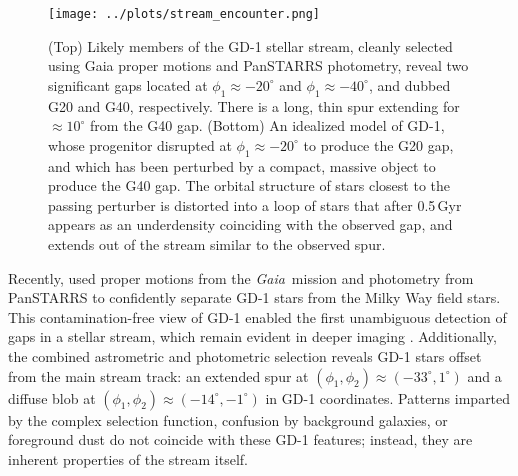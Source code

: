 \documentclass[twocolumn]{aastex62}
\newcommand{\gaia}{\textsl{Gaia}}
\begin{document}
\begin{figure}
\begin{center}
\texttt{[image: ../plots/stream\_encounter.png]}
\end{center}
\caption{(Top) Likely members of the GD-1 stellar stream, cleanly selected using Gaia proper motions and PanSTARRS photometry, reveal two significant gaps located at $\phi_1\approx-20^\circ$ and $\phi_1\approx-40^\circ$, and dubbed G20 and G40, respectively.
There is a long, thin spur extending for $\approx10^\circ$ from the G40 gap.
(Bottom) An idealized model of GD-1, whose progenitor disrupted at $\phi_1\approx-20^\circ$ to produce the G20 gap, and which has been perturbed by a compact, massive object to produce the G40 gap.
The orbital structure of stars closest to the passing perturber is distorted into a loop of stars that after 0.5\,Gyr appears as an underdensity coinciding with the observed gap, and extends out of the stream similar to the observed spur.
}
\label{fig:fiducial}
\end{figure}

Recently, \citet{pwb} used proper motions from the \gaia\ mission \citep{gdr2} and photometry from PanSTARRS \citep{ps} to confidently separate GD-1 stars from the Milky Way field stars.
This contamination-free view of GD-1 enabled the first unambiguous detection of gaps in a stellar stream, which remain evident in deeper imaging \citep{deboer2018}.
Additionally, the combined astrometric and photometric selection reveals GD-1 stars offset from the main stream track: an extended spur at $(\phi_1, \phi_2)\approx(-33^\circ,1^\circ)$ and a diffuse blob at $(\phi_1, \phi_2)\approx(-14^\circ,-1^\circ)$ in GD-1 coordinates.
Patterns imparted by the complex selection function, confusion by background galaxies, or foreground dust do not coincide with these GD-1 features; instead, they are inherent properties of the stream itself.
\end{document}
